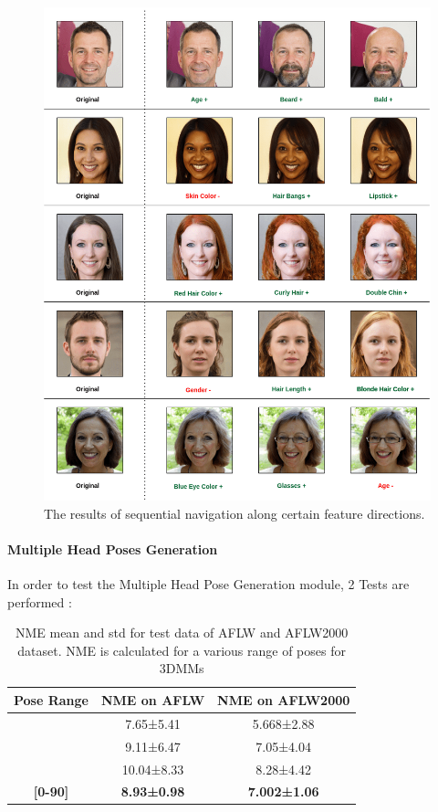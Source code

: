 \begin{figure}[H]
    \centering
    \includegraphics[width=\textwidth]{images/sequential-nav.png}
    \caption{The results of sequential navigation along certain feature directions.}
    \label{fig:nav_res}
\end{figure}

\paragraph{Multiple Head Poses Generation}

In order to test the Multiple Head Pose Generation module, 2 Tests are performed : \\

\begin{table}[H]
\caption{NME mean and std for test data of AFLW and AFLW2000 dataset. NME is calculated for a various range of poses for 3DMMs}
\centering
\begin{tabular}[t]{| c | c | c |}
\hline
Pose Range & NME on \textbf{AFLW} & NME on \textbf{AFLW2000} \\
\hline
[0-30] & 7.65±5.41 & 5.668±2.88 \\
\hline
[30-60] & 9.11±6.47 & 7.05±4.04 \\
\hline
[30-90] & 10.04±8.33 & 8.28±4.42 \\
\hline
\textbf{[0-90]} & \textbf{8.93±0.98} & \textbf{7.002±1.06} \\
\hline
\end{tabular}
\label{nme_table}
\end{table}

